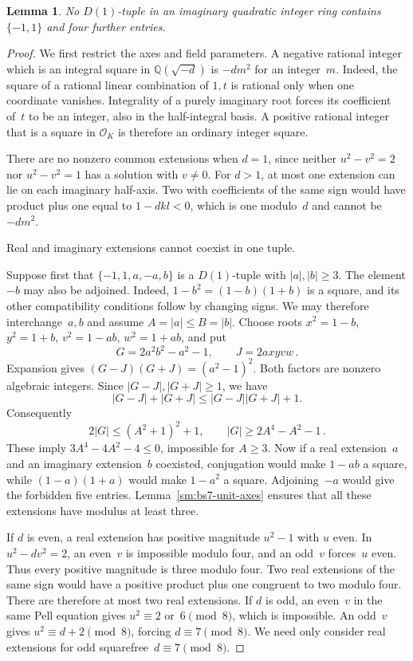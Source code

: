 \documentclass[12pt]{article}
\newtheorem{lemma}[theorem]{Lemma}
\newcommand{\OK}{\mathcal O_K}
\numberwithin{equation}{section}
\begin{document}
\begin{lemma}\label{sm:bs7-unit-pair}
No $D(1)$-tuple in an imaginary quadratic integer ring contains $\{-1,1\}$ and four further entries.
\end{lemma}
\begin{proof}
We first restrict the axes and field parameters. A negative rational integer which is an integral square in $\mathbb Q(\sqrt{-d})$ is $-dm^2$ for an integer~$m$. Indeed, the square of a rational linear combination of $1,t$ is rational only when one coordinate vanishes. Integrality of a purely imaginary root forces its coefficient of~$t$ to be an integer, also in the half-integral basis. A positive rational integer that is a square in $\OK$ is therefore an ordinary integer square.

There are no nonzero common extensions when $d=1$, since neither $u^2-v^2=2$ nor $u^2-v^2=1$ has a solution with $v\ne0$. For $d>1$, at most one extension can lie on each imaginary half-axis. Two with coefficients of the same sign would have product plus one equal to $1-dkl<0$, which is one modulo~$d$ and cannot be $-dm^2$.

Real and imaginary extensions cannot coexist in one tuple.

Suppose first that $\{-1,1,a,-a,b\}$ is a $D(1)$-tuple with $|a|,|b|\ge3$. The element $-b$ may also be adjoined. Indeed, $1-b^2=(1-b)(1+b)$ is a square, and its other compatibility conditions follow by changing signs. We may therefore interchange~$a,b$ and assume $A=|a|\le B=|b|$. Choose roots $x^2=1-b$, $y^2=1+b$, $v^2=1-ab$, $w^2=1+ab$, and put
\begin{equation*}
 G=2a^2b^2-a^2-1,\qquad J=2axyvw\,.
\end{equation*}
Expansion gives $(G-J)(G+J)=(a^2-1)^2$. Both factors are nonzero algebraic integers. Since $|G-J|,|G+J|\ge1$, we have
\[
 |G-J|+|G+J|\le|G-J||G+J|+1.
\] Consequently
\begin{equation*}
 2|G|\le(A^2+1)^2+1,\qquad |G|\ge2A^4-A^2-1\,.
\end{equation*}
These imply $3A^4-4A^2-4\le0$, impossible for $A\ge3$. Now if a real extension~$a$ and an imaginary extension~$b$ coexisted, conjugation would make $1-ab$ a square, while $(1-a)(1+a)$ would make $1-a^2$ a square. Adjoining~$-a$ would give the forbidden five entries. Lemma~\ref{sm:bs7-unit-axes} ensures that all these extensions have modulus at least three.

If $d$ is even, a real extension has positive magnitude $u^2-1$ with $u$ even. In $u^2-dv^2=2$, an even~$v$ is impossible modulo four, and an odd~$v$ forces~$u$ even. Thus every positive magnitude is three modulo four. Two real extensions of the same sign would have a positive product plus one congruent to two modulo four. There are therefore at most two real extensions. If $d$ is odd, an even~$v$ in the same Pell equation gives $u^2\equiv2$ or~$6\pmod8$, which is impossible. An odd~$v$ gives $u^2\equiv d+2\pmod8$, forcing $d\equiv7\pmod8$. We need only consider real extensions for odd squarefree~$d\equiv7\pmod8$.


\end{proof}
\end{document}
